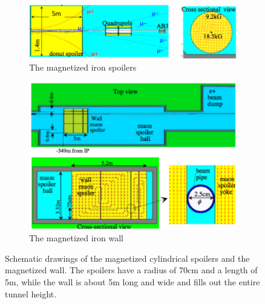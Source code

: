 \documentclass[12pt]{article}
\begin{document}
\begin{figure}
    \centering
    \begin{subfigure}[b]{0.53\textwidth}
        \includegraphics[width=\textwidth]{figures/Spoiler.png}
        \caption{The magnetized iron spoilers}
	\label{fig:spoilers}
    \end{subfigure}
    \begin{subfigure}[b]{0.42\textwidth}
        \includegraphics[width=\textwidth]{figures/Muon_wall.pdf}
        \caption{The magnetized iron wall}
        \label{fig:wall}
    \end{subfigure}
    \caption[Schematic drawings of the shielding systems]{
    Schematic drawings of the magnetized cylindrical spoilers and the magnetized wall.
    The spoilers have a radius of \unit{70}{cm} and a length of \unit{5}{m}, while the wall is about \unit{5}{m} long and wide and fills out the entire tunnel height.
    }
    \label{fig:Spoilers_Wall}
\end{figure}
\end{document}
